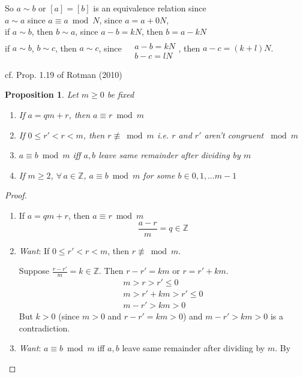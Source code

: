 \documentclass[10pt]{amsart}
\newtheorem{proposition}{Proposition}
\begin{document}
\begin{multicols*}{2}
So $a\sim b$ or $[a] = [b]$ is an equivalence relation since \\
$a\sim a$ since $a\equiv a \bmod{N}$, since $a=a+0N$, \\
if $a\sim b$, then $b\sim a$, since $a-b=kN$, then $b=a-kN$ \\
if $a\sim b$, $b\sim c$, then $a\sim c$, since $\begin{aligned} & \quad \\ 
	& a-b = kN \\
	& b-c = lN \end{aligned}$, then $a-c = (k+l)N$.  
	
	



cf. Prop. 1.19 of Rotman (2010) \cite{JRotman2010}  
\begin{proposition}
Let $m\geq 0$ be fixed 
\begin{enumerate}
	\item If $a=qm +r$, then $a \equiv r \bmod{m}$ 
	\item  If $0\leq r' <r <m$, then $r \not\equiv\bmod{m}$ i.e. $r$ and $r'$ aren't congruent $\bmod{m}$  
	\item $a \equiv b \bmod{m}$ iff $a,b$ leave same remainder after dividing by $m$  
	\item If $m\geq 2$, $\forall \, a \in \mathbb{Z}$, $a \equiv b \bmod{m}$ for some $b\in 0,1,\dots m-1$  
\end{enumerate}	
\end{proposition}

\begin{proof}
\begin{enumerate}
	\item If $a=qm +r$, then $a \equiv r \bmod{m}$ 
	\[
	\frac{a-r}{m} = q \in \mathbb{Z}  
	\]
	\item  \emph{Want}: If $0\leq r' <r <m$, then $r \not\equiv\bmod{m}$.  
	
	Suppose $\frac{r-r'}{m} = k \in \mathbb{Z}$.  Then $r-r' = km$ or $r=r' + km$.  
	\[
	\begin{gathered}
	m > r > r' \leq 0 \\
	m > r' + km > r' \leq 0 \\
	m-r' > km > 0 
	\end{gathered}
	\]
	But $k>0$ (since $m>0$ and $r-r' = km >0$) and $m-r' > km > 0$ is a contradiction.  
	
	\item \emph{Want}: $a \equiv b \bmod{m}$ iff $a,b$ leave same remainder after dividing by $m$.  By 
	

\end{enumerate}
\end{proof}
\end{multicols*}
\end{document}
